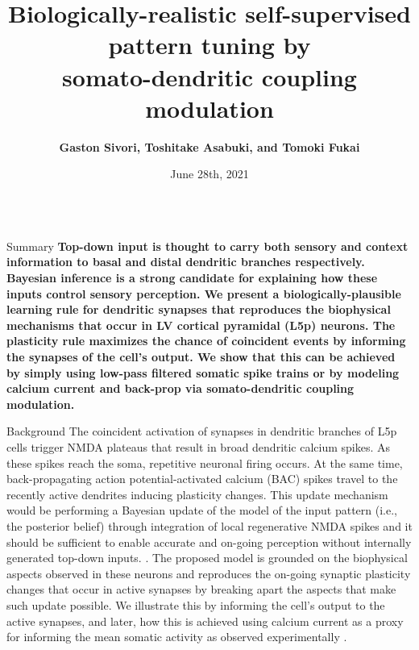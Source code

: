 \documentclass[final]{beamer}
\title{\huge Biologically-realistic self-supervised pattern tuning by \\somato-dendritic coupling modulation}
\author{\textbf{Gaston Sivori, Toshitake Asabuki, and Tomoki Fukai}}
\institute[OIST]{Neural Coding and Brain Computing Unit, OIST Graduate University, Okinawa, Japan}
\date[June 28th, 2021]{June 28th, 2021}
\begin{document}
\begin{frame}
\begin{multicols}{3}

\begin{column}{.325\textwidth}

\begin{block}{Summary}
  \justify
  \textbf{Top-down input is thought to carry both sensory and context information to basal and distal dendritic branches respectively. Bayesian inference is a strong candidate for explaining how these inputs control sensory perception. We present a biologically-plausible learning rule for dendritic synapses that reproduces the biophysical mechanisms that occur in LV cortical pyramidal (L5p) neurons. The plasticity rule maximizes the chance of coincident events by informing the synapses of the cell's output. We show that this can be achieved by simply using low-pass filtered somatic spike trains or by modeling calcium current and back-prop via somato-dendritic coupling modulation.}
\end{block}

\begin{block}{Background}
  \justify
 The coincident activation of synapses in dendritic branches of L5p cells trigger NMDA plateaus that result in broad dendritic calcium spikes. As these spikes reach the soma, repetitive neuronal firing occurs. At the same time, back-propagating action potential-activated calcium (BAC) spikes travel to the recently active dendrites inducing plasticity changes. This update mechanism would be performing a Bayesian update of the model of the input pattern (i.e., the posterior belief) through integration of local regenerative NMDA spikes \cite{larkum2009} and it should be sufficient to enable accurate and on-going perception without internally generated top-down inputs. \cite{manita2017}. The proposed model is grounded on the biophysical aspects observed in these neurons and reproduces the on-going synaptic plasticity changes that occur in active synapses by breaking apart the aspects that make such update possible. We illustrate this by informing the cell's output to the active synapses, and later, how this is achieved using calcium current as a proxy for informing the mean somatic activity as observed experimentally \cite{krieger2017}.
\end{block}


\end{column}
\end{multicols}
\end{frame}
\end{document}

